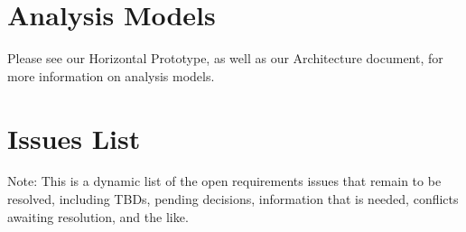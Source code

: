 \documentclass[12pt,oneside,letterpaper]{article}
\begin{document}
\section{Analysis Models}
Please see our Horizontal Prototype, as well as our Architecture document, for more information on analysis models.

\section{Issues List}
Note: This is a dynamic list of the open requirements issues that remain to be resolved, including TBDs, pending decisions, information that is needed, conflicts awaiting resolution, and the like.
\end{document}
